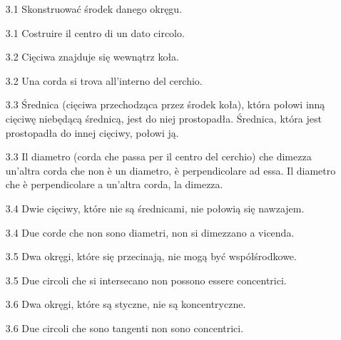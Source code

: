 \begin{enumerate}
    \item [3.1] Skonstruować środek danego okręgu. %
    \item [3.1] Costruire il centro di un dato circolo. %

    \item [3.2] Cięciwa znajduje się wewnątrz koła. %
    \item [3.2] Una corda si trova all'interno del cerchio. %

    \item [3.3] Średnica (cięciwa przechodząca przez środek koła), która połowi inną cięciwę niebędącą średnicą, jest do niej prostopadła. Średnica, która jest prostopadła do innej cięciwy, połowi ją. %
    \item [3.3] Il diametro (corda che passa per il centro del cerchio) che dimezza un'altra corda che non è un diametro, è perpendicolare ad essa. Il diametro che è perpendicolare a un'altra corda, la dimezza. %

    \item [3.4] Dwie cięciwy, które nie są średnicami, nie połowią się nawzajem. %
    \item [3.4] Due corde che non sono diametri, non si dimezzano a vicenda. %

    \item [3.5] Dwa okręgi, które się przecinają, nie mogą być współśrodkowe.  %
    \item [3.5] Due circoli che si intersecano non possono essere concentrici. %

    \item [3.6] Dwa okręgi, które są styczne, nie są koncentryczne. %
    \item [3.6] Due circoli che sono tangenti non sono concentrici. %


\end{enumerate}
